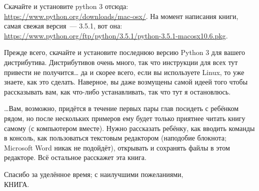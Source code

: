 \begin{MAC}
	
Скачайте и установите python 3 отсюда: \url{https://www.python.org/downloads/mac-osx/}. На момент написания книги, самая свежая версия — 3.5.1, вот она: \url{https://www.python.org/ftp/python/3.5.1/python-3.5.1-macosx10.6.pkg}.


\end{MAC}

\begin{LINUX}

Прежде всего, скачайте и установите последнюю версию Python 3 для вашего дистрибутива. Дистрибутивов очень много, так что инструкции для всех тут привести не получится… да и скорее всего, если вы используете Linux, то уже знаете, как это сделать. Наверное, вы даже возмущены самой идеей того чтобы рассказывать вам, как что-либо устанавливать, так что тут я остановлюсь.

\end{LINUX}


…Вам, возможно, придётся в течение первых пары глав посидеть с ребёнком рядом, но после нескольких примеров ему будет только приятнее читать книгу самому (с компьютером вместе). Нужно рассказать ребёнку, как вводить команды в консоль, как пользоваться текстовым редактором (наподобие блокнота; Microsoft Word никак не подойдёт), открывать и сохранять файлы в этом редакторе. Всё остальное расскажет эта книга.

\vspace{12pt}
\noindent
Спасибо за уделённое время; с наилучшими пожеланиями,\\
КНИГА.
